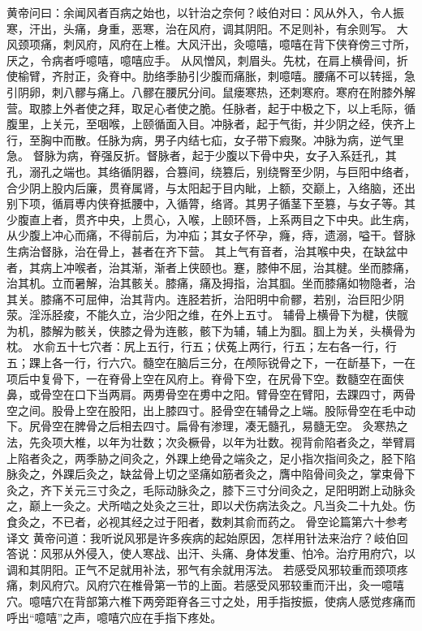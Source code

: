 \documentclass[a4paper,12pt,UTF8,twoside]{ctexbook}
\begin{document}
黄帝问曰：余闻风者百病之始也，以针治之奈何？岐伯对曰：风从外入，令人振寒，汗出，头痛，身重，恶寒，治在风府，调其阴阳。不足则补，有余则写。
大风颈项痛，刺风府，风府在上椎。大风汗出，灸噫嘻，噫嘻在背下侠脊傍三寸所，厌之，令病者呼噫嘻，噫嘻应手。
从风憎风，刺眉头。先枕，在肩上横骨间，折使榆臂，齐肘正，灸脊中。肋络季胁引少腹而痛胀，刺噫嘻。腰痛不可以转摇，急引阴卵，刺八髎与痛上。八髎在腰尻分间。鼠瘘寒热，还刺寒府。寒府在附膝外解营。取膝上外者使之拜，取足心者使之脆。任脉者，起于中极之下，以上毛际，循腹里，上关元，至咽喉，上颐循面入目。冲脉者，起于气街，并少阴之经，侠齐上行，至胸中而散。任脉为病，男子内结七疝，女子带下瘕聚。冲脉为病，逆气里急。
督脉为病，脊强反折。督脉者，起于少腹以下骨中央，女子入系廷孔，其孔，溺孔之端也。其络循阴器，合篡间，绕篡后，别绕臀至少阴，与巨阳中络者，合少阴上股内后廉，贯脊属肾，与太阳起于目内眦，上额，交巅上，入络脑，还出别下项，循肩尃内侠脊抵腰中，入循膂，络肾。其男子循茎下至篡，与女子等。其少腹直上者，贯齐中央，上贯心，入喉，上颐环唇，上系两目之下中央。此生病，从少腹上冲心而痛，不得前后，为冲疝；其女子怀孕，癃，痔，遗溺，嗌干。督脉生病治督脉，治在骨上，甚者在齐下营。
其上气有音者，治其喉中央，在缺盆中者，其病上冲喉者，治其渐，渐者上侠颐也。蹇，膝伸不屈，治其楗。坐而膝痛，治其机。立而暑解，治其骸关。膝痛，痛及拇指，治其腘。坐而膝痛如物隐者，治其关。膝痛不可屈伸，治其背内。连胫若折，治阳明中俞髎，若别，治巨阳少阴荥。淫泺胫痠，不能久立，治少阳之维，在外上五寸。
辅骨上横骨下为楗，侠髋为机，膝解为骸关，侠膝之骨为连骸，骸下为辅，辅上为腘。腘上为关，头横骨为枕。
水俞五十七穴者：尻上五行，行五；伏菟上两行，行五；左右各一行，行五；踝上各一行，行六穴。髓空在脑后三分，在颅际锐骨之下，一在龂基下，一在项后中复骨下，一在脊骨上空在风府上。脊骨下空，在尻骨下空。数髓空在面侠鼻，或骨空在口下当两肩。两旉骨空在旉中之阳。臂骨空在臂阳，去踝四寸，两骨空之间。股骨上空在股阳，出上膝四寸。胫骨空在辅骨之上端。股际骨空在毛中动下。尻骨空在脾骨之后相去四寸。扁骨有渗理，凑无髓孔，易髓无空。
灸寒热之法，先灸项大椎，以年为壮数；次灸橛骨，以年为壮数。视背俞陷者灸之，举臂肩上陷者灸之，两季胁之间灸之，外踝上绝骨之端灸之，足小指次指间灸之，胫下陷脉灸之，外踝后灸之，缺盆骨上切之坚痛如筋者灸之，膺中陷骨间灸之，掌束骨下灸之，齐下关元三寸灸之，毛际动脉灸之，膝下三寸分间灸之，足阳明跗上动脉灸之，巅上一灸之。犬所啮之处灸之三壮，即以犬伤病法灸之。凡当灸二十九处。伤食灸之，不已者，必视其经之过于阳者，数刺其俞而药之。
骨空论篇第六十参考译文
黄帝问道：我听说风邪是许多疾病的起始原因，怎样用针法来治疗？岐伯回答说：风邪从外侵入，使人寒战、出汗、头痛、身体发重、怕冷。治疗用府穴，以调和其阴阳。正气不足就用补法，邪气有余就用泻法。
若感受风邪较重而颈项疼痛，刺风府穴。风府穴在椎骨第一节的上面。若感受风邪较重而汗出，灸一噫嘻穴。噫嘻穴在背部第六椎下两旁距脊各三寸之处，用手指按振，使病人感觉疼痛而呼出“噫嘻”之声，噫嘻穴应在手指下疼处。
\end{document}
